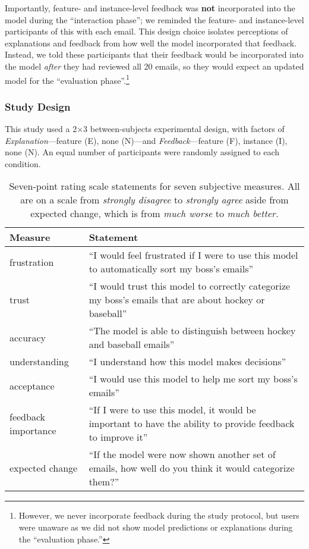 Importantly, feature- and instance-level feedback was \textbf{not} incorporated into the model during the ``interaction phase''; we reminded the feature- and instance-level participants of this with each email. This design choice isolates perceptions of explanations and feedback from how well the model incorporated that feedback.
Instead, we told these participants that their feedback would be incorporated into the model \textit{after} they had reviewed all 20 emails, so they would expect an updated model for the ``evaluation phase''.\footnote{However, we never incorporate feedback during the study protocol, but users were unaware as we did not show model predictions or explanations during the ``evaluation phase.''}

\subsubsection{Study Design}
This study used a 2$\times$3 between-subjects experimental design, with factors of \textit{Explanation}---feature (E), none (N)---and \textit{Feedback}---feature (F), instance (I), none (N). An equal number of participants were randomly assigned to each condition.

\begin{table}[t!]
    \scriptsize
    \begin{center}
    \begin{tabular}{p{1.5cm} p{6.5cm}}
        \toprule
        Measure & Statement \\
        \midrule
        frustration & ``I would feel frustrated if I were to use this model to automatically sort my boss's emails''\\
        trust & ``I would trust this model to correctly categorize my boss's emails that are about hockey or baseball''\\
        accuracy & ``The model is able to distinguish between hockey and baseball emails''\\
        understanding & ``I understand how this model makes decisions''\\
        acceptance & ``I would use this model to help me sort my boss's emails''\\
        feedback importance & ``If I were to use this model, it would be important to have the ability to provide feedback to improve it''\\
        expected change & ``If the model were now shown another set of emails, how well do you think it would categorize them?''\\
        \bottomrule
    \end{tabular}
    \end{center}
    \caption{Seven-point rating scale statements for seven subjective measures. All are on a scale from \emph{strongly disagree} to \emph{strongly agree} aside from expected change, which is from \emph{much worse} to \emph{much better.}}
    \vspace{-10pt}
    \label{tab:subjective_measures}
\end{table}

